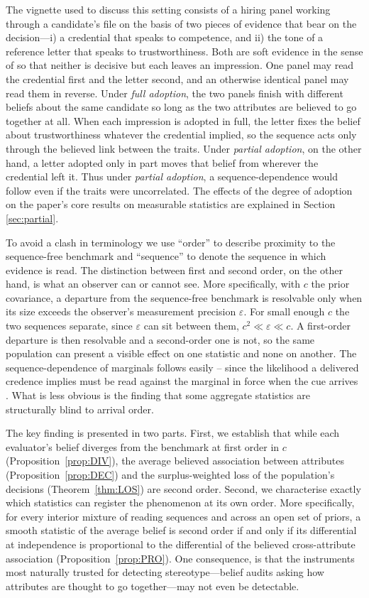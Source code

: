 \documentclass[a4paper,fleqn]{cas-sc}
\theoremstyle{remark}
\theoremstyle{definition}
\begin{document}
The vignette used to discuss this setting consists of a hiring panel working through a candidate’s file on the basis of two pieces of evidence that bear on the decision---i) a credential that speaks to competence, and ii) the tone of a reference letter that speaks to trustworthiness. Both are soft evidence in the sense of \citet{Jeffrey1983} so that neither is decisive but each leaves an impression. One panel may read the credential first and the letter second, and an otherwise identical panel may read them in reverse. Under \emph{full adoption}, the two panels finish with different beliefs about the same candidate so long as the two attributes are believed to go together at all. When each impression is adopted in full, the letter fixes the belief about trustworthiness whatever the credential implied, so the sequence acts only through the believed link between the traits. Under \emph{partial adoption}, on the other hand, a letter adopted only in part moves that belief from wherever the credential left it. Thus under \emph{partial adoption}, a sequence-dependence would follow even if the traits were uncorrelated. The effects of the degree of adoption on the paper's core results on measurable statistics are explained in Section \ref{sec:partial}.

To avoid a clash in terminology we use ``order'' to describe proximity to the sequence-free benchmark and ``sequence'' to denote the sequence in which evidence is read. The distinction between first and second order, on the other hand, is what an observer can or cannot see. More specifically, with $c$ the prior covariance, a departure from the sequence-free benchmark is resolvable only when its size exceeds the observer's measurement precision $\varepsilon$. For small enough $c$ the two sequences separate, since $\varepsilon$ can sit between them, $c^{2}\ll\varepsilon\ll c$. A first-order departure is then resolvable and a second-order one is not, so the same population can present a visible effect on one statistic and none on another. The sequence-dependence of marginals follows easily -- since the likelihood a delivered credence implies must be read against the marginal in force when the cue arrives \citep{Domotor1980}. What is less obvious is the finding that some aggregate statistics are structurally blind to arrival order. 

The key finding is presented in two parts. First, we establish that while each evaluator's belief diverges from the benchmark at first order in $c$ (Proposition~\ref{prop:DIV}), the average believed association between attributes (Proposition~\ref{prop:DEC}) and the surplus-weighted loss of the population's decisions (Theorem~\ref{thm:LOS}) are second order. Second, we characterise exactly which statistics can register the phenomenon at its own order. More specifically, for every interior mixture of reading sequences and across an open set of priors, a smooth statistic of the average belief is second order if and only if its differential at independence is proportional to the differential of the believed cross-attribute association (Proposition~\ref{prop:PRO}). One consequence, is that the instruments most naturally trusted for detecting stereotype---belief audits asking how attributes are thought to go together---may not even be detectable.
\end{document}
